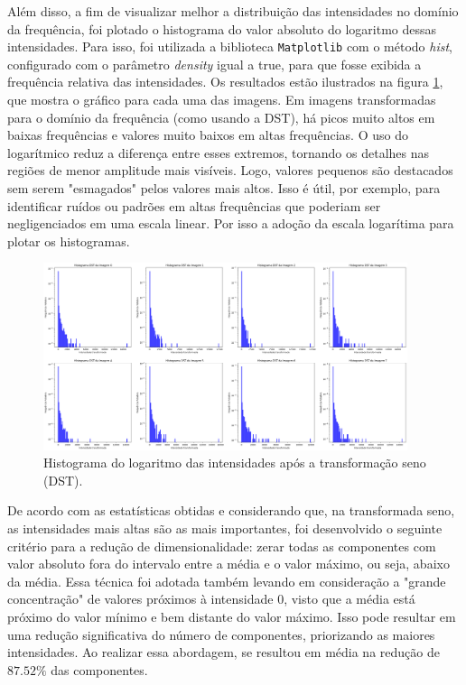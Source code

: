 \documentclass[a4paper, 11pt]{article}
\begin{document}
Além disso, a fim de visualizar melhor a distribuição das intensidades no domínio da frequência, foi plotado o histograma do valor absoluto do logaritmo dessas intensidades. Para isso, foi utilizada a biblioteca \texttt{Matplotlib} com o método \textit{hist}, configurado com o parâmetro \textit{density} igual a true, para que fosse exibida a frequência relativa das intensidades. Os resultados estão ilustrados na figura \ref{fig:4_hist}, que mostra o gráfico para cada uma das imagens. Em imagens transformadas para o domínio da frequência (como usando a DST), há picos muito altos em baixas frequências e valores muito baixos em altas frequências. O uso do logarítmico reduz a diferença entre esses extremos, tornando os detalhes nas regiões de menor amplitude mais visíveis. Logo, valores pequenos são destacados sem serem "esmagados" pelos valores mais altos. Isso é útil, por exemplo, para identificar ruídos ou padrões em altas frequências que poderiam ser negligenciados em uma escala linear. Por isso a adoção da escala logarítima para plotar os histogramas.

\begin{figure}[H]
    \centering
    \includegraphics[width=0.95\textwidth]{imgs/4_hist.png}
    \caption{Histograma do logaritmo das intensidades após a transformação seno (DST).}
    \label{fig:4_hist} %
\end{figure}

De acordo com as estatísticas obtidas e considerando que, na transformada seno, as intensidades mais altas são as mais importantes, foi desenvolvido o seguinte critério para a redução de dimensionalidade: zerar todas as componentes com valor absoluto fora do intervalo entre a média e o valor máximo, ou seja, abaixo da média. Essa técnica foi adotada também levando em consideração a "grande concentração" de valores próximos à intensidade 0, visto que a média está próximo do valor mínimo e bem distante do valor máximo. Isso pode resultar em uma redução significativa do número de componentes, priorizando as maiores intensidades. Ao realizar essa abordagem, se resultou em média na redução de $87.52\%$ das componentes.
\end{document}
